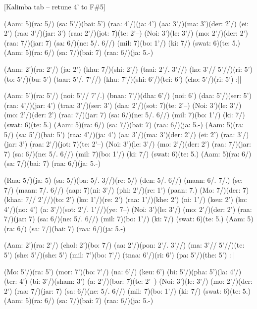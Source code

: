 \documentclass[11pt]{article}
\begin{document}
[Kalimba tab -- retune 4' to F\#5]
\begin{jianpu}
(Aam: 5)(ra: 5/) (sa: 5'/)(bai: 5') (raa: 4'/)(ja: 4')
(aa: 3'/)(ma: 3')(der: 2'/) (ei: 2') (raa: 3'/)(jar: 3') (raa: 2'/)(jot: 7)(te: 2'--)
(Noi: 3')(le: 3'/) (mo: 2'/)(der: 2') (raa: 7/)(jar: 7)
(sa: 6/)(ne: 5/. 6//) (mil: 7)(bo: 1'/) (ki: 7/) (swat: 6)(te: 5.)
(Aam: 5)(ra: 6/) (sa: 7/)(bai: 7) (raa: 6/)(ja: 5.-)

(Aam: 2')(ra: 2'/) (ja: 2') (khu: 7/)(shi: 2'/) (taai: 2'/. 3'//) (ko: 3'// 5'//)(ri: 5')
(to: 5'/)(bu: 5') (taar: 5'/. 7'//) (khu: 7'/)(shi: 6'/)(tei: 6') (cho: 5'/)(ri: 5') :||

(Aam: 5')(ra: 5'/) (noi: 5'// 7'/.) (bnaa: 7'/)(dha: 6'/) (noi: 6') (daa: 5'/)(ser: 5')
(raa: 4'/)(jar: 4') (traa: 3'/)(ser: 3') (daa: 2'/)(sot: 7)(te: 2'--)
(Noi: 3')(le: 3'/) (mo: 2'/)(der: 2') (raa: 7/)(jar: 7)
(sa: 6/)(ne: 5/. 6//) (mil: 7)(bo: 1'/) (ki: 7/) (swat: 6)(te: 5.)
(Aam: 5)(ra: 6/) (sa: 7/)(bai: 7) (raa: 6/)(ja: 5.-)
(Aam: 5)(ra: 5/) (sa: 5'/)(bai: 5') (raa: 4'/)(ja: 4')
(aa: 3'/)(ma: 3')(der: 2'/) (ei: 2') (raa: 3'/)(jar: 3') (raa: 2'/)(jot: 7)(te: 2'--)
(Noi: 3')(le: 3'/) (mo: 2'/)(der: 2') (raa: 7/)(jar: 7)
(sa: 6/)(ne: 5/. 6//) (mil: 7)(bo: 1'/) (ki: 7/) (swat: 6)(te: 5.)
(Aam: 5)(ra: 6/) (sa: 7/)(bai: 7) (raa: 6/)(ja: 5.-)

(Raa: 5/)(ja: 5) (sa: 5/)(ba: 5/. 3//)(re: 5/) (den: 5/. 6//) (maan: 6/. 7/.)
(se: 7/) (maan: 7/. 6//) (aap: 7)(ni: 3'/) (phi: 2'/)(re: 1') (paan: 7.)
(Mo: 7/)(der: 7) (khaa: 7// 2'//)(to: 2') (ko: 1'/)(re: 2') (raa: 1'/)(khe: 2')
(ni: 1'/) (keu: 2') (ko: 4'/)(no: 4') (a: 3'/)(sot: 2'/. 1'//)(ye: 7--)
(Noi: 3')(le: 3'/) (mo: 2'/)(der: 2') (raa: 7/)(jar: 7)
(sa: 6/)(ne: 5/. 6//) (mil: 7)(bo: 1'/) (ki: 7/) (swat: 6)(te: 5.)
(Aam: 5)(ra: 6/) (sa: 7/)(bai: 7) (raa: 6/)(ja: 5.-)

(Aam: 2')(ra: 2'/) (chol: 2')(bo: 7/) (aa: 2'/)(pon: 2'/. 3'//) (ma: 3'// 5'//)(te: 5')
(she: 5'/)(she: 5') (mil: 7')(bo: 7'/) (tnaa: 6'/)(ri: 6') (pa: 5'/)(the: 5') :||

(Mo: 5'/)(ra: 5') (mor: 7')(bo: 7'/) (na: 6'/) (keu: 6')
(bi: 5'/)(pha: 5')(la: 4'/)(ter: 4') (bi: 3'/)(sham: 3') (a: 2'/)(bor: 7)(te: 2'--)
(Noi: 3')(le: 3'/) (mo: 2'/)(der: 2') (raa: 7/)(jar: 7)
(sa: 6/)(ne: 5/. 6//) (mil: 7)(bo: 1'/) (ki: 7/) (swat: 6)(te: 5.)
(Aam: 5)(ra: 6/) (sa: 7/)(bai: 7) (raa: 6/)(ja: 5.-)
\end{jianpu}
\end{document}
